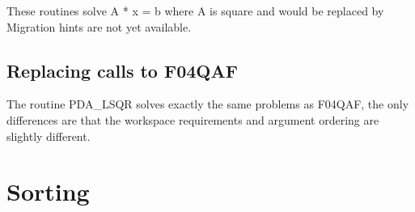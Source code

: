    These routines solve A * x = b where A is square and would be replaced
   by
   Migration hints are not yet available.


\subsection{Replacing calls to F04QAF}
   The routine PDA\_LSQR solves exactly the same problems as F04QAF, the
   only differences are that the workspace requirements and argument
   ordering are slightly different.


\section{Sorting}

